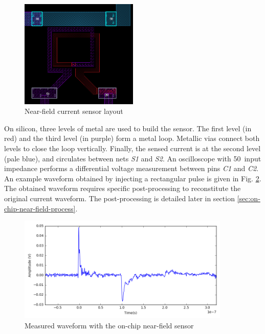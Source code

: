 \begin{figure}[!h]
  \centering
  \includegraphics[width=0.5\textwidth]{src/3/figures/sensor_layout.png}
  \caption{Near-field current sensor layout}
  \label{fig:near-field-current-sensor-layout}
\end{figure}

On silicon, three levels of metal are used to build the sensor.
The first level (in red) and the third level (in purple) form a metal loop.
Metallic vias connect both levels to close the loop vertically.
Finally, the sensed current is at the second level (pale blue), and circulates between nets \textit{S1} and \textit{S2}.
An oscilloscope with 50\textOmega\ input impedance performs a differential voltage measurement between pins \textit{C1} and \textit{C2}.
An example waveform obtained by injecting a rectangular pulse is given in Fig. \ref{fig:nfs-wvf}.
The obtained waveform requires specific post-processing to reconstitute the original current waveform.
The post-processing is detailed later in section \ref{sec:on-chip-near-field-process}.

\begin{figure}[!h]
  \centering
  \includegraphics[width=0.9\textwidth]{src/3/figures/measured_waveform.png}
  \caption{Measured waveform with the on-chip near-field sensor}
  \label{fig:nfs-wvf}
\end{figure}


